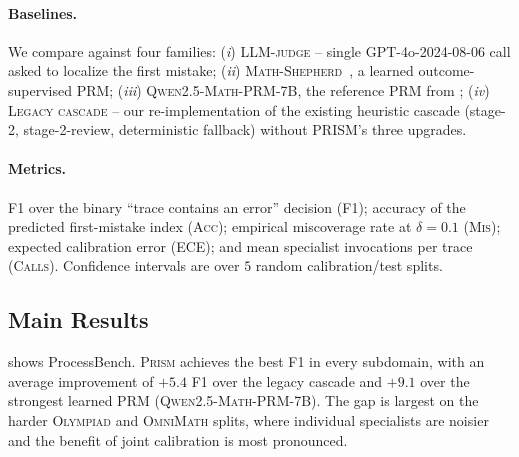 \documentclass[11pt,a4paper]{article}
\theoremstyle{plain}
\theoremstyle{definition}
\theoremstyle{remark}
\begin{document}
\paragraph{Baselines.} We compare against four families:
(\emph{i}) \textsc{LLM-judge} -- single GPT-4o-2024-08-06 call asked
to localize the first mistake;
(\emph{ii}) \textsc{Math-Shepherd}~\citep{wang2024mathshepherd},
a learned outcome-supervised PRM;
(\emph{iii}) \textsc{Qwen2.5-Math-PRM-7B}, the reference PRM from
\citet{zheng2024processbench};
(\emph{iv}) \textsc{Legacy cascade} -- our re-implementation of the
existing heuristic cascade (stage-2, stage-2-review, deterministic
fallback) without PRISM's three upgrades.

\paragraph{Metrics.}
F1 over the binary ``trace contains an error'' decision
(\textsc{F1}); accuracy of the predicted first-mistake index
(\textsc{Acc}); empirical miscoverage rate at $\delta{=}0.1$
(\textsc{Mis}); expected calibration error (\textsc{ECE}); and
mean specialist invocations per trace (\textsc{Calls}).
Confidence intervals are over $5$ random calibration/test splits.

\subsection{Main Results}

 shows ProcessBench. \textsc{Prism} achieves the best
F1 in every subdomain, with an average improvement of
$\mathbf{+5.4}$ F1 over the legacy cascade and
$\mathbf{+9.1}$ over the strongest learned PRM
(\textsc{Qwen2.5-Math-PRM-7B}). The gap is largest on the harder
\textsc{Olympiad} and \textsc{OmniMath} splits, where individual
specialists are noisier and the benefit of joint calibration is most
pronounced.
\end{document}
